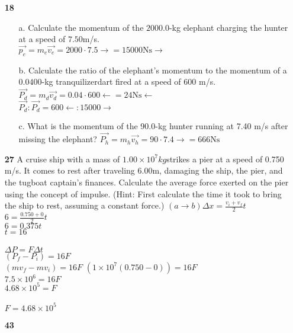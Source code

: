 \documentclass[]{article}
\date{}
\title{\docTitle}
\author{\docAuthor}
\date{\today}
\begin{document}
\newcommand{\pv}[1]{\overrightarrow{#1}}
\maketitle
\begin{enumerate}
    
    \item[\bf{18}] \begin{enumerate}
        \item[a.]  Calculate the momentum of the $2000.0$-kg elephant charging the hunter at a speed of $7.50$m/s.\\
        $\pv{p_e} = m_e\pv{v_e} = 2000 \cdot 7.5 \rightarrow = 15000 \text{Ns} \rightarrow$\\
        \item[b.] Calculate the ratio of the elephant's momentum to the momentum of a $0.0400$-kg tranquilizerdart fired at a speed of $600$ m/s.\\
        $\pv{P_d} = m_d\pv{v_d} = 0.04 \cdot 600 \leftarrow = 24 \text{Ns} \leftarrow$\\
        $\pv{P_d} : \pv{P_d} = 600 \leftarrow : 15000 \rightarrow$\\
        \item[c.] What is the momentum of the 90.0-kg hunter running at 7.40 m/s after missing the elephant?
        $\pv{P_h} = m_h\pv{v_h} = 90 \cdot 7.4 \rightarrow = 666 \text{Ns}$
    \end{enumerate}
    \item[\bf{27}]A cruise ship with a mass of $1.00 \times 10^7 kg$strikes a
    pier at a speed of 0.750 m/s. It comes to rest after
    traveling $6.00$m, damaging the ship, the pier, and
    the tugboat captain's finances. Calculate the average
    force exerted on the pier using the concept of
    impulse. (Hint: First calculate the time it took to
    bring the ship to rest, assuming a constant force.)
    $(a\rightarrow b) \Delta x = \frac{v_i + v_f}{2}t $\\$ 6 = \frac{0.750 + 0}{2}t$\\$ 6 = 0.375t$\\$t = 16$\\
    \\
    $\Delta P = F \Delta t$\\
    $(P_f - P_i) = 16F$\\
    $(mv_f - mv_i) = 16F$
    $(1\times{10^7}(0.750 - 0)) = 16F$\\
    $7.5\times 10^6 = 16F$\\
    $4.68\times 10^5 = F$\\
    \\
    $F = 4.68\times{10^5}$

    \item[\bf{43}]
\end{enumerate}
\end{document}
